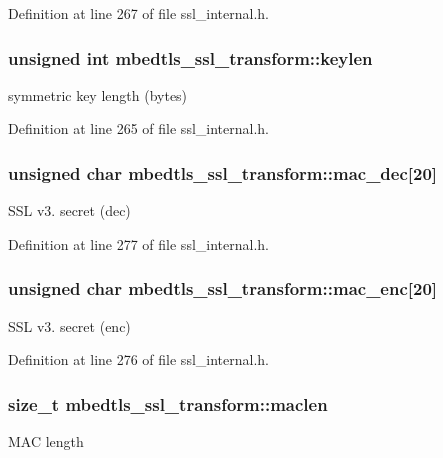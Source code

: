 Definition at line 267 of file ssl\-\_\-internal.\-h.

\hypertarget{structmbedtls__ssl__transform_aacb827d7f8a0d31359870c64d213baa9}{
\subsubsection[{keylen}]{\setlength{\rightskip}{0pt plus 5cm}unsigned int mbedtls\-\_\-ssl\-\_\-transform\-::keylen}}\label{structmbedtls__ssl__transform_aacb827d7f8a0d31359870c64d213baa9}
symmetric key length (bytes) 

Definition at line 265 of file ssl\-\_\-internal.\-h.

\hypertarget{structmbedtls__ssl__transform_a3170985961f116ffc229315acfe91373}{
\subsubsection[{mac\-\_\-dec}]{\setlength{\rightskip}{0pt plus 5cm}unsigned char mbedtls\-\_\-ssl\-\_\-transform\-::mac\-\_\-dec\mbox{[}20\mbox{]}}}\label{structmbedtls__ssl__transform_a3170985961f116ffc229315acfe91373}
S\-S\-L v3. secret (dec) 

Definition at line 277 of file ssl\-\_\-internal.\-h.

\hypertarget{structmbedtls__ssl__transform_a6f9cda9ccf9ca99b7170f394180f49a2}{
\subsubsection[{mac\-\_\-enc}]{\setlength{\rightskip}{0pt plus 5cm}unsigned char mbedtls\-\_\-ssl\-\_\-transform\-::mac\-\_\-enc\mbox{[}20\mbox{]}}}\label{structmbedtls__ssl__transform_a6f9cda9ccf9ca99b7170f394180f49a2}
S\-S\-L v3. secret (enc) 

Definition at line 276 of file ssl\-\_\-internal.\-h.

\hypertarget{structmbedtls__ssl__transform_a2b616bec2cc218b736dffe87e58efc56}{
\subsubsection[{maclen}]{\setlength{\rightskip}{0pt plus 5cm}size\-\_\-t mbedtls\-\_\-ssl\-\_\-transform\-::maclen}}\label{structmbedtls__ssl__transform_a2b616bec2cc218b736dffe87e58efc56}
M\-A\-C length 

